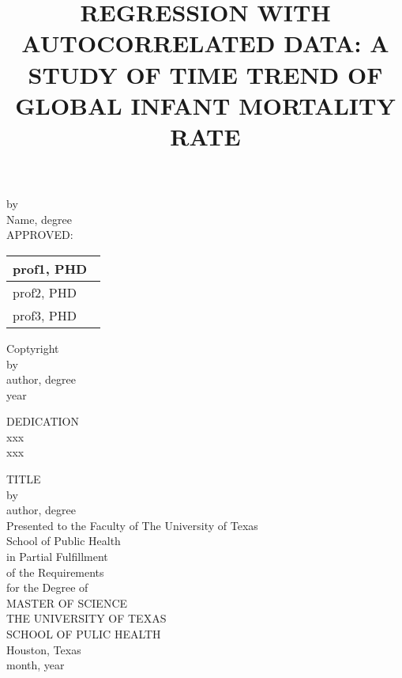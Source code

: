 \documentclass[12pt]{article}
\begin{document}
\begin{titlepage}
\doublespacing
\title{\normalsize REGRESSION WITH AUTOCORRELATED DATA: A STUDY OF TIME TREND OF GLOBAL INFANT MORTALITY RATE}
\date{}
\maketitle

{\normalsize
\begin{center}
by\\[5mm]
Name, degree\\[10mm]
APPROVED:\\[10mm]
\end{center}}

\begin{table}[h]
\begin{flushright}
\begin{tabular}{ p{8cm}}

\hline
prof1, PHD\ \\[0.8cm]
\hline
prof2, PHD\\[0.8cm]
\hline
prof3, PHD\\

\end{tabular}
\end{flushright}
\label{default}
\end{table}

\thispagestyle{empty}
\pagestyle{empty}
\end{titlepage}

\newpage
\thispagestyle{empty}
\begin{center}
Coptyright\\
by\\
author, degree\\
year
\end{center}


\newpage
\thispagestyle{empty}
\doublespacing
\begin{center}
DEDICATION\\
xxx\\
xxx
\end{center}


\newpage
\thispagestyle{empty}
\doublespacing
\begin{center}
{\normalsize TITLE}\\[3.2cm]

by\\[0.5cm]

author, degree\\[3.2cm]

Presented to the Faculty of The University of Texas\\
School of Public Health\\
in Partial Fulfillment\\
of the Requirements\\
for the Degree of\\[1.5cm]
MASTER OF SCIENCE\\[1.5cm]
\singlespacing
THE UNIVERSITY OF TEXAS\\
SCHOOL OF PULIC HEALTH\\
Houston, Texas\\
month, year
\end{center}
\end{document}
